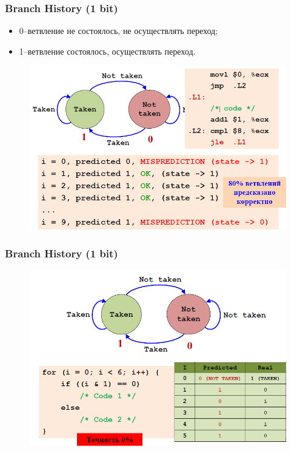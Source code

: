 \documentclass{beamer}
\begin{document}
\begin{frame}

\frametitle{Branch History (1 bit)}


\begin{itemize}
\item 0–ветвление не состоялось, не осуществлять переход;
\item 1–ветвление состоялось, осуществлять переход.
\end{itemize}


\begin{figure}
\includegraphics[scale=0.45]{Pic_3}
\end{figure}

\end{frame}



\begin{frame}
\frametitle{Branch History (1 bit)}

\begin{figure}
\includegraphics[scale=0.55]{Pic_4}
\end{figure}

\end{frame}
\end{document}
